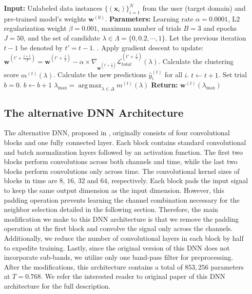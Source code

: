 \documentclass[12pt]{iopart}
\DeclareMathOperator*{\argmax}{arg\,max}
\newcommand{\matr}[1]{\mathbf{#1}}
\begin{document}
\begin{algorithm}[t!]
   \centering
   \caption{Source-Free Adaptation of DNN $f_{\matr w}$}
   \label{alg:adaptation}
\begin{algorithmic}[1]
   \STATE \textbf{Input:} Unlabeled data instances $\{(\matr{x}_i)\}_{i=1}^{N}$ from the user (target domain) and pre-trained model's weights ${\matr w^{(0)}}$.
   \STATE \textbf{Parameters:} Learning rate $\alpha=0.0001$, L2 regularization weight $\beta=0.001$, maximum number of trials $B=3$ and epochs $J=50$, and the set of candidate $\lambda \in \Lambda=\{0,0.2,\cdots,1\}$.
   \STATE Let the previous iteration $t-1$ be denoted by $t'=t-1$.
   \FOR{$\lambda \in \Delta$}
   .
   \REPEAT   
   \STATE Apply gradient descent to update: \\ ${\matr w^{(t' + \frac{j+1}{J})}} = {\matr w^{(t' + \frac{j}{J})}} - \alpha \times   \nabla_{\matr w^{(t' + \frac{j}{J})}}\mathcal{L}_{{total}}^{(t' + \frac{j}{J})}(\lambda)$.
   \ENDFOR
   \STATE Calculate the clustering score  $m^{(t)}(\lambda)$.
        \STATE Calculate the new predictions $\hat{y}_i^{(t)}$ for all $i$.
        \STATE $t\leftarrow t+1$.
        \STATE Set trial $b=0$.
   \ELSE 
        \STATE $b\leftarrow b+1$
   \ENDIF
   \ENDFOR
   \STATE $\lambda_{\text{max}} = \argmax_{\lambda \in \Delta} m^{(t)}(\lambda) $  
   \STATE \textbf{Return:} $\matr{w}^{(t)}({\lambda_{\text{max}}})$
\end{algorithmic}
\end{algorithm}


\subsection{The alternative DNN Architecture}
The alternative DNN, proposed in \cite{another_network}, originally consists of four convolutional blocks and one fully connected layer. Each block contains standard convolutional and batch normalization layers followed by an activation function. The first two blocks perform convolutions across both channels and time, while the last two blocks perform convolutions only across time. The convolutional kernel sizes of blocks in time are $8$, $16$, $32$ and $64$, respectively. Each block pads the input signal to keep the same output dimension as the input dimension. However, this padding operation prevents learning the channel combination necessary for the neighbor selection detailed in the following section. Therefore, the main modification we make to this DNN architecture is that we remove the padding operation at the first block and convolve the signal only across the channels. Additionally, we reduce the number of convolutional layers in each block by half to expedite training. Lastly, since the original version of this DNN does not incorporate sub-bands, we utilize only one band-pass filter for preprocessing. {After the modifications, this architecture contains a total of $853,256$ parameters at $T=0.768$.} We refer the interested reader to original paper of this DNN architecture \cite{another_network} for the full description.
\end{document}
